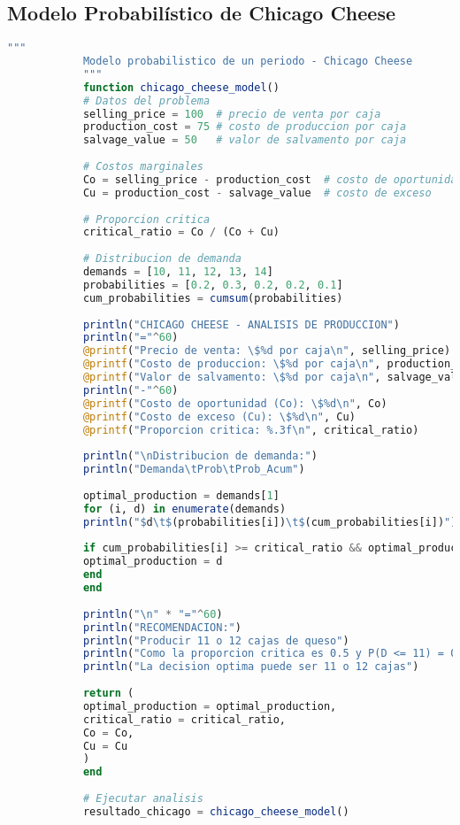 \documentclass[12pt,a4paper]{book}
\begin{document}
	\subsection{Modelo Probabil\'istico de Chicago Cheese}
	
	\begin{tcolorbox}[enhanced,colback=verdeclaro,colframe=verdeprincipal,boxrule=2pt,arc=8pt,
		title={\bfseries\color{white} \faCode\ CHICAGO CHEESE - JULIA},breakable]
		
		\begin{lstlisting}[language=Julia,basicstyle=\footnotesize\ttfamily]
			"""
			Modelo probabilistico de un periodo - Chicago Cheese
			"""
			function chicago_cheese_model()
			# Datos del problema
			selling_price = 100  # precio de venta por caja
			production_cost = 75 # costo de produccion por caja
			salvage_value = 50   # valor de salvamento por caja
			
			# Costos marginales
			Co = selling_price - production_cost  # costo de oportunidad (falta)
			Cu = production_cost - salvage_value  # costo de exceso
			
			# Proporcion critica
			critical_ratio = Co / (Co + Cu)
			
			# Distribucion de demanda
			demands = [10, 11, 12, 13, 14]
			probabilities = [0.2, 0.3, 0.2, 0.2, 0.1]
			cum_probabilities = cumsum(probabilities)
			
			println("CHICAGO CHEESE - ANALISIS DE PRODUCCION")
			println("="^60)
			@printf("Precio de venta: \$%d por caja\n", selling_price)
			@printf("Costo de produccion: \$%d por caja\n", production_cost)
			@printf("Valor de salvamento: \$%d por caja\n", salvage_value)
			println("-"^60)
			@printf("Costo de oportunidad (Co): \$%d\n", Co)
			@printf("Costo de exceso (Cu): \$%d\n", Cu)
			@printf("Proporcion critica: %.3f\n", critical_ratio)
			
			println("\nDistribucion de demanda:")
			println("Demanda\tProb\tProb_Acum")
			
			optimal_production = demands[1]
			for (i, d) in enumerate(demands)
			println("$d\t$(probabilities[i])\t$(cum_probabilities[i])")
			
			if cum_probabilities[i] >= critical_ratio && optimal_production == demands[1]
			optimal_production = d
			end
			end
			
			println("\n" * "="^60)
			println("RECOMENDACION:")
			println("Producir 11 o 12 cajas de queso")
			println("Como la proporcion critica es 0.5 y P(D <= 11) = 0.5")
			println("La decision optima puede ser 11 o 12 cajas")
			
			return (
			optimal_production = optimal_production,
			critical_ratio = critical_ratio,
			Co = Co,
			Cu = Cu
			)
			end
			
			# Ejecutar analisis
			resultado_chicago = chicago_cheese_model()
		\end{lstlisting}
		
	\end{tcolorbox}
	
\end{document}
